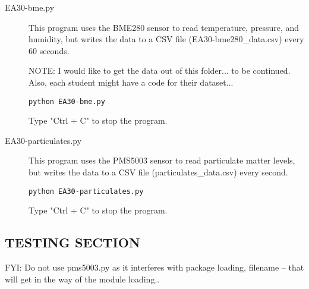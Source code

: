 \documentclass{article}
\begin{document}
\begin{description}

  \item[EA30-bme.py] This program uses the BME280 sensor to read temperature, pressure, and humidity, but writes the data to a CSV file (EA30-bme280\_data.csv) every 60 seconds. 
  
NOTE: I would like to get the data out of this folder... to be continued. Also, each student might have a code for their dataset...
  
\begin{verbatim}
python EA30-bme.py
\end{verbatim} 

Type "Ctrl + C" to stop the program.
  
\item[EA30-particulates.py] This program uses the PMS5003 sensor to read particulate matter levels, but writes the data to a CSV file (particulates\_data.csv) every second.

\begin{verbatim}
python EA30-particulates.py
\end{verbatim}



Type "Ctrl + C" to stop the program.

\end{description}


\subsection{TESTING SECTION}

FYI: Do not use pms5003.py as it interferes with package loading, filename -- that will get in the way of the module loading..
\end{document}
